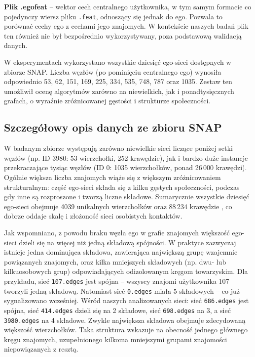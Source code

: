 \textbf{Plik .egofeat} -- wektor cech centralnego użytkownika, w tym samym formacie co pojedynczy wiersz pliku \verb|.feat|, odnoszący się jednak do ego. Pozwala to porównać cechy ego z cechami jego znajomych. W kontekście naszych badań plik ten również nie był bezpośrednio wykorzystywany, poza podstawową walidacją danych.

W eksperymentach wykorzystano wszystkie dziesięć ego-sieci dostępnych w zbiorze SNAP. Liczba węzłów (po pominięciu centralnego ego) wynosiła odpowiednio 53, 62, 151, 169, 225, 334, 535, 748, 787 oraz 1035. Zestaw ten umożliwił ocenę algorytmów zarówno na niewielkich, jak i ponadtysięcznych grafach, o wyraźnie zróżnicowanej gęstości i strukturze społeczności.

\subsection{Szczegółowy opis danych ze zbioru SNAP}
W badanym zbiorze występują zarówno niewielkie sieci liczące poniżej setki węzłów (np. ID 3980: 53 wierzchołki, 252 krawędzie), jak i bardzo duże instancje przekraczające tysiąc węzłów (ID 0: 1035 wierzchołków, ponad 26\,000 krawędzi). Ogólnie większa liczba znajomych wiąże się z większym zróżnicowaniem strukturalnym: część ego-sieci składa się z kilku gęstych społeczności, podczas gdy inne są rozproszone i tworzą liczne składowe. Sumarycznie wszystkie dziesięć ego-sieci obejmuje 4039 unikalnych wierzchołków oraz 88\,234 krawędzie \cite{McAuley2012}, co dobrze oddaje skalę i złożoność sieci osobistych kontaktów.

Jak wspomniano, z powodu braku węzła ego w grafie znajomych większość ego-sieci dzieli się na więcej niż jedną składową spójności. W praktyce zazwyczaj istnieje jedna dominująca składowa, zawierająca największą grupę wzajemnie powiązanych znajomych, oraz kilka mniejszych składowych (np. dwu- lub kilkuosobowych grup) odpowiadających odizolowanym kręgom towarzyskim. Dla przykładu, sieć \verb|107.edges| jest spójna -- wszyscy znajomi użytkownika 107 tworzyli jedną składową. Natomiast sieć \verb|0.edges| miała 5 składowych -- co już sygnalizowano wcześniej. Wśród naszych analizowanych sieci: sieć \verb|686.edges| jest spójna, sieć \verb|414.edges| dzieli się na 2 składowe, sieć \verb|698.edges| na 3, a sieć \verb|3980.edges| na 4 składowe. Zwykle największa składowa obejmuje zdecydowaną większość wierzchołków. Taka struktura wskazuje na obecność jednego głównego kręgu znajomych, uzupełnionego kilkoma mniejszymi grupami znajomości niepowiązanych z resztą.


